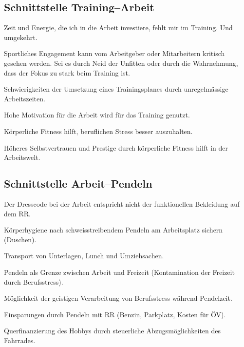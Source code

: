 \subsection{Schnittstelle Training--Arbeit}


  \begin{itemize*}
    \item Zeit und Energie, die ich in die Arbeit investiere, fehlt mir im Training. Und umgekehrt.
    \item Sportliches Engagement kann vom Arbeitgeber oder Mitarbeitern kritisch gesehen werden.
      Sei es durch Neid der Unfitten oder durch die Wahrnehmung, dass der Fokus zu stark beim Training ist.
    \item Schwierigkeiten der Umsetzung eines Trainingsplanes durch unregelmässige Arbeitszeiten.
  \end{itemize*}


  \begin{itemize*}
    \item Hohe Motivation für die Arbeit wird für das Training genutzt.
    \item Körperliche Fitness hilft, beruflichen Stress besser auszuhalten.
    \item Höheres Selbstvertrauen und Prestige durch körperliche Fitness hilft in der Arbeitswelt.
  \end{itemize*}

\subsection{Schnittstelle Arbeit--Pendeln}


  \begin{itemize*}
    \item Der Dresscode bei der Arbeit entspricht nicht der funktionellen Bekleidung auf dem RR.
    \item Körperhygiene nach schweisstreibendem Pendeln am Arbeitsplatz sichern (Duschen).
    \item Transport von Unterlagen, Lunch und Umziehsachen.
  \end{itemize*}


  \begin{itemize*}
    \item Pendeln als Grenze zwischen Arbeit und Freizeit (Kontamination der Freizeit durch Berufsstress).
    \item Möglichkeit der geistigen Verarbeitung von Berufsstress während Pendelzeit.
    \item Einsparungen durch Pendeln mit RR (Benzin, Parkplatz, Kosten für ÖV).
    \item Querfinanzierung des Hobbys durch steuerliche Abzugsmöglichkeiten des Fahrrades.
  \end{itemize*}

